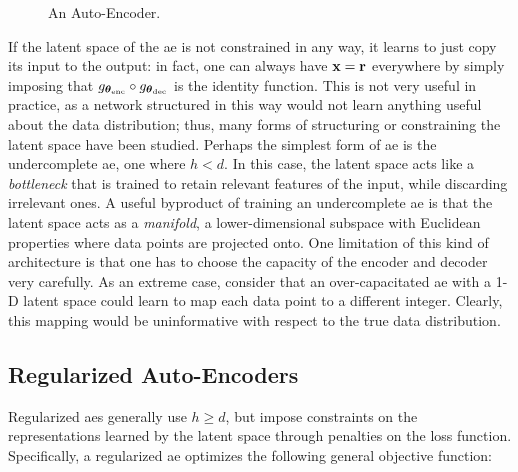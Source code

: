 \begin{figure*}[h!]
    \centering
    \resizebox{.45\textwidth}{!}{}
    \caption{An Auto-Encoder.}
    \label{fig:autoencoder}
\end{figure*}
If the latent space of the \gls{ae} is not constrained in any way, it learns to just copy its input to the output: in fact, one can always have $\Vector{x} = \Vector{r}$ everywhere by simply imposing that $g_{\boldsymbol{\theta}_{\mathrm{enc}}} \circ g_{\boldsymbol{\theta}_{\mathrm{dec}}}$ is the identity function. This is not very useful in practice, as a network structured in this way would not learn anything useful about the data distribution; thus, many forms of structuring or constraining the latent space have been studied. Perhaps the simplest form of \gls{ae} is the undercomplete \gls{ae}, \ie one where $h < d$. In this case, the latent space acts like a \emph{bottleneck} that is trained to retain relevant features of the input, while discarding irrelevant ones.
A useful byproduct of training an undercomplete \gls{ae} is that the latent space acts as a \emph{manifold}, \ie a lower-dimensional subspace with Euclidean properties where data points are projected onto. One limitation of this kind of architecture is that one has to choose the capacity of the encoder and decoder very carefully. As an extreme case, consider that an over-capacitated \gls{ae} with a 1-D latent space could learn to map each data point to a different integer. Clearly, this mapping would be uninformative with respect to the true data distribution.

\subsection{Regularized Auto-Encoders}
Regularized \glspl{ae} generally use $h \geq d$, but impose constraints on the representations learned by the latent space through penalties on the loss function. Specifically, a regularized \gls{ae} optimizes the following general objective function:

